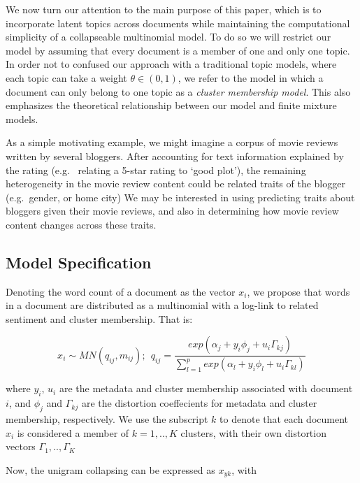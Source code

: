 \documentclass[12pt]{article}
\begin{document}
We now turn our attention to the main purpose of this paper, which is to
incorporate latent topics across documents while maintaining the computational simplicity of a collapseable multinomial model. To do so we will restrict our model by assuming that every document is a member of one and only one topic. In order not to confused our approach with a traditional topic models, where each topic can take a weight $\theta \in (0,1)$, we refer to the model in which a document can only belong to one topic as a \textit{cluster membership model}. This also emphasizes the theoretical relationship between our model and finite mixture models. 

As a simple motivating example, we might imagine a corpus of
movie reviews written by several bloggers. After accounting for text
information explained by the rating (e.g. ~relating a 5-star rating to
`good plot'), the remaining heterogeneity in the movie review
content could be related traits of the blogger (e.g.~gender, or home
city) We may be interested in using predicting traits about bloggers
given their movie reviews, and also in determining how movie review
content changes across these traits.




\subsection{Model Specification}\label{model-specification}

Denoting the word count of a document as the vector $x_i$, we propose
that words in a document are distributed as a multinomial with a
log-link to related sentiment and cluster membership. That is:

\begin{equation}
 x_{i} \sim MN(q_{ij},m_{ij})    ; ~~  q_{ij} = \frac{exp(\alpha_j + y_i \phi_j + u_i \Gamma_{kj})}{\sum_{l=1}^{p}{exp(\alpha_l+ y_i \phi_l + u_i \Gamma_{kl})}}
\end{equation} 


where $y_i$, $u_i$ are the metadata and cluster membership associated
with document $i$, and $\phi_j$ and $\Gamma_{kj}$ are the distortion
coeffecients for metadata and cluster membership, respectively. We use
the subscript $k$ to denote that each document $x_i$ is considered a
member of $k = 1,..,K$ clusters, with their own distortion vectors
$\Gamma_1,..,\Gamma_K$

Now, the unigram collapsing can be expressed as $x_{yk}$, with
\end{document}
